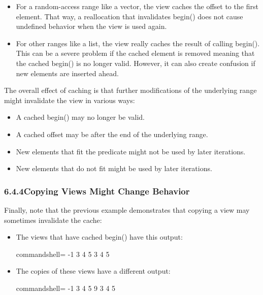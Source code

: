 \begin{itemize}
\item
For a random-access range like a vector, the view caches the offset to the first element. That way, a reallocation that invalidates begin() does not cause undefined behavior when the view is used again.

\item
For other ranges like a list, the view really caches the result of calling begin(). This can be a severe problem if the cached element is removed meaning that the cached begin() is no longer valid. However, it can also create confusion if new elements are inserted ahead.
\end{itemize}

The overall effect of caching is that further modifications of the underlying range might invalidate the view in various ways:

\begin{itemize}
\item
A cached begin() may no longer be valid.

\item
A cached offset may be after the end of the underlying range.

\item
New elements that fit the predicate might not be used by later iterations.

\item
New elements that do not fit might be used by later iterations.
\end{itemize}

\subsubsection*{ 6.4.4\hspace{0.2cm}Copying Views Might Change Behavior}

Finally, note that the previous example demonstrates that copying a view may sometimes invalidate the cache:

\begin{itemize}
\item
The views that have cached begin() have this output:

{\footnotesize
\begin{tcblisting}{commandshell={}}
-1 3 4 5
3 4 5
\end{tcblisting}
}

\item
The copies of these views have a different output:

{\footnotesize
\begin{tcblisting}{commandshell={}}
-1 3 4 5
9 3 4 5
\end{tcblisting}
}
\end{itemize}

